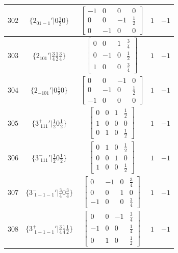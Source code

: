\documentclass[fleqn,8pt]{jsarticle}
\begin{document}
\begin{longtable}{ccccc}
$ 302 $ & $ \{2{}_{01-1}{}'|0 \frac{1}{2} 0\} $ & $ \begin{bmatrix} -1 & 0 & 0 & 0 \\ 0 & 0 & -1 & \frac{1}{2} \\ 0 & -1 & 0 & 0 \end{bmatrix} $ & $ 1 $ & $ -1 $ \\ \hline
$ 303 $ & $ \{2{}_{101}{}'|\frac{3}{4} \frac{1}{2} \frac{3}{4}\} $ & $ \begin{bmatrix} 0 & 0 & 1 & \frac{3}{4} \\ 0 & -1 & 0 & \frac{1}{2} \\ 1 & 0 & 0 & \frac{3}{4} \end{bmatrix} $ & $ 1 $ & $ -1 $ \\ \hline
$ 304 $ & $ \{2{}_{-101}{}'|0 \frac{1}{2} 0\} $ & $ \begin{bmatrix} 0 & 0 & -1 & 0 \\ 0 & -1 & 0 & \frac{1}{2} \\ -1 & 0 & 0 & 0 \end{bmatrix} $ & $ 1 $ & $ -1 $ \\ \hline
$ 305 $ & $ \{3^{+}_{\,\,111}{}'|\frac{1}{2} 0 \frac{1}{2}\} $ & $ \begin{bmatrix} 0 & 0 & 1 & \frac{1}{2} \\ 1 & 0 & 0 & 0 \\ 0 & 1 & 0 & \frac{1}{2} \end{bmatrix} $ & $ 1 $ & $ -1 $ \\ \hline
$ 306 $ & $ \{3^{-}_{\,\,111}{}'|\frac{1}{2} 0 \frac{1}{2}\} $ & $ \begin{bmatrix} 0 & 1 & 0 & \frac{1}{2} \\ 0 & 0 & 1 & 0 \\ 1 & 0 & 0 & \frac{1}{2} \end{bmatrix} $ & $ 1 $ & $ -1 $ \\ \hline
$ 307 $ & $ \{3^{-}_{\,\,1-1-1}{}'|\frac{3}{4} 0 \frac{3}{4}\} $ & $ \begin{bmatrix} 0 & -1 & 0 & \frac{3}{4} \\ 0 & 0 & 1 & 0 \\ -1 & 0 & 0 & \frac{3}{4} \end{bmatrix} $ & $ 1 $ & $ -1 $ \\ \hline
$ 308 $ & $ \{3^{+}_{\,\,1-1-1}{}'|\frac{3}{4} \frac{1}{4} \frac{1}{2}\} $ & $ \begin{bmatrix} 0 & 0 & -1 & \frac{3}{4} \\ -1 & 0 & 0 & \frac{1}{4} \\ 0 & 1 & 0 & \frac{1}{2} \end{bmatrix} $ & $ 1 $ & $ -1 $ \\ \hline

\end{longtable}
\end{document}
